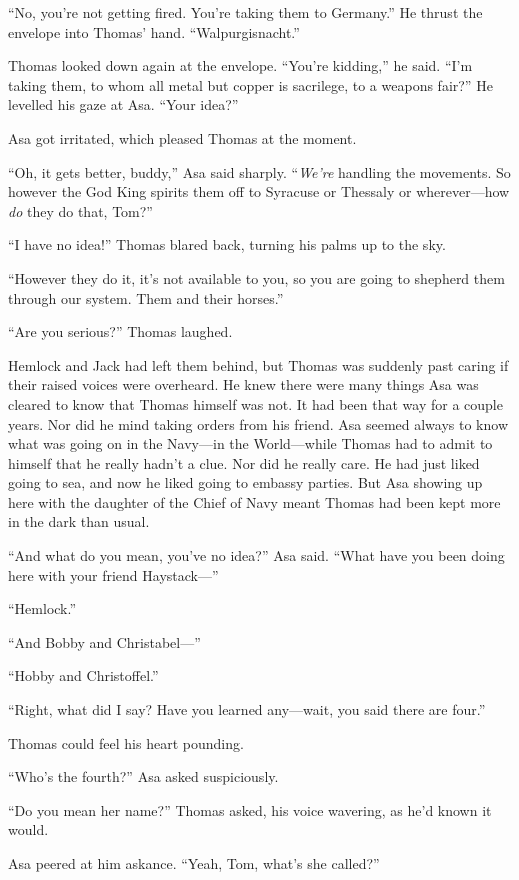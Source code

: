 \documentclass[11pt,a5paper]{article}
\begin{document}
``No, you're not getting fired. You're taking them to Germany.'' He thrust the envelope into Thomas' hand. ``Walpurgisnacht.''

Thomas looked down again at the envelope. ``You're kidding,'' he said. ``I'm taking them, to whom all metal but copper is  sacrilege, to a weapons fair?'' He levelled his gaze at Asa. ``Your idea?''

Asa got irritated, which pleased Thomas at the moment.

``Oh, it gets better, buddy,'' Asa said sharply. ``\emph{We're} handling the movements. So however the God King spirits them off to Syracuse or Thessaly or wherever---how \emph{do} they do that, Tom?''

``I have no idea!'' Thomas blared back, turning his palms up to the sky.

``However they do it, it's not available to you, so you are going to shepherd them through our system. Them and their horses.''

``Are you serious?'' Thomas laughed.

Hemlock and Jack had left them behind, but Thomas was suddenly past caring if their raised voices were overheard. He knew there were many things Asa was cleared to know that Thomas himself was not. It had been that way for a couple years. Nor did he mind taking orders from his friend. Asa seemed always to know what was going on in the Navy---in the World---while Thomas had to admit to himself that he really hadn't a clue. Nor did he really care. He had just liked going to sea, and now he liked going to embassy parties. But Asa showing up here with the daughter of the Chief of Navy meant Thomas had been kept more in the dark than usual.

``And what do you mean, you've no idea?'' Asa said. ``What have you been doing here with your friend Haystack---''

``Hemlock.''

``And Bobby and Christabel---''

``Hobby and Christoffel.''

``Right, what did I say? Have you learned any---wait, you said there are four.''

Thomas could feel his heart pounding.

``Who's the fourth?'' Asa asked suspiciously.

``Do you mean her name?'' Thomas asked, his voice wavering, as he'd known it would.

Asa peered at him askance. ``Yeah, Tom, what's she called?''
\end{document}

